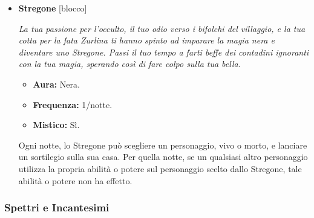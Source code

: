 \documentclass[a4paper,10pt]{article}
\begin{document}
\begin{itemize}
            \begin{multicols}{3}
                  \begin{itemize}
                        \item \textbf{Aura:} Nera.
                        \item \textbf{Frequenza:} 1/notte.
                        \item \textbf{Mistico:} No.
                  \end{itemize}
            \end{multicols}

            Ogni notte, il Sequestratore può scegliere un personaggio vivo e rapirlo. Se tale personaggio effettua un movimento, il Sequestratore scopre tale movimento, e l'abilità che lo ha generato non ha effetto.

      \item \textbf{Stregone} [blocco]

            \emph{La tua passione per l'occulto, il tuo odio verso i bifolchi del villaggio, e la tua cotta per la fata Zurlina ti hanno spinto ad imparare la magia nera e diventare uno Stregone. Passi il tuo tempo a farti beffe dei contadini ignoranti con la tua magia, sperando così di fare colpo sulla tua bella.}

            \begin{multicols}{3}
                  \begin{itemize}
                        \item \textbf{Aura:} Nera.
                        \item \textbf{Frequenza:} 1/notte.
                        \item \textbf{Mistico:} Sì.
                  \end{itemize}
            \end{multicols}

            Ogni notte, lo Stregone può scegliere un personaggio, vivo o morto, e lanciare un sortilegio sulla sua casa. Per quella notte, se un qualsiasi altro personaggio utilizza la propria abilità o potere sul personaggio scelto dallo Stregone, tale abilità o potere non ha effetto. %
\end{itemize}


\subsubsection*{Spettri e Incantesimi}
\label{spettri}
\label{incantesimi}
\end{document}
